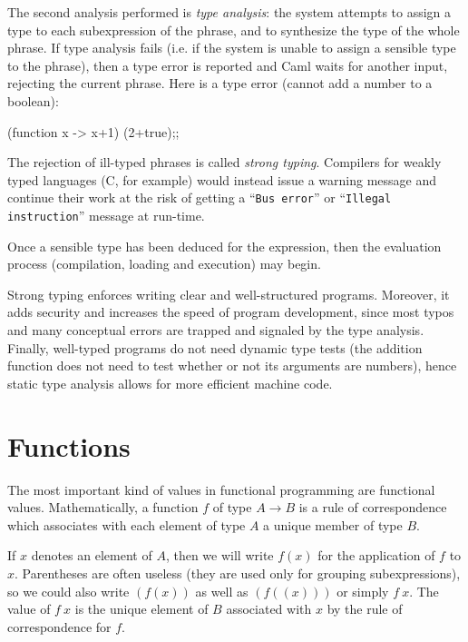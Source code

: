 The second analysis performed is {\em type analysis}: the system
attempts to assign a type to each subexpression of the phrase, and to
synthesize the type of the whole phrase.  If type analysis fails (i.e.
if the system is unable to assign a sensible type to the phrase), then
a type error is reported and Caml waits for another input, rejecting
the current phrase.  Here is a type error (cannot add a number to a
boolean):
\begin{caml_example}
(function x -> x+1) (2+true);;
\end{caml_example}
The rejection of ill-typed phrases is called {\em strong typing}.
Compilers for weakly typed languages (C, for example) would instead
issue a warning message and continue their work at the risk of
getting a ``{\tt Bus error}'' or ``{\tt Illegal instruction}''
message at run-time. 

Once a sensible type has been deduced for the expression, then the
evaluation process (compilation, loading and execution) may
begin.

Strong typing enforces writing clear and well-structured programs.
Moreover, it adds security and increases the speed of program development,
since most typos and many conceptual errors are trapped and signaled
by the type analysis.
Finally, well-typed programs do not need dynamic type tests (the addition
function does not need to test whether or not its arguments are numbers),
hence static type analysis allows for more efficient machine code.

\section{Functions}

The most important kind of values in functional programming are
functional values. Mathematically, a function $f$ of type $A \rightarrow B$ is
a rule of correspondence which associates with each element of type $A$ a
unique member of type $B$.

If $x$ denotes an element of $A$, then we will write $f(x)$ for the
application of $f$ to $x$. Parentheses are often useless (they are
used only for grouping subexpressions), so we could also write $(f
(x))$ as well as $(f ((x)))$ or simply $f~x$. The value of $f~x$ is
the unique element of $B$ associated with $x$ by the rule of
correspondence for $f$.

